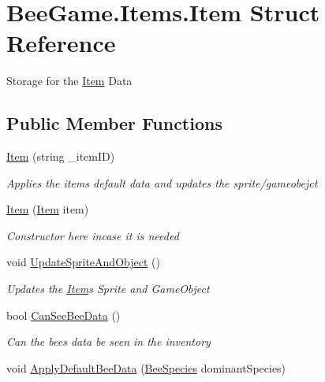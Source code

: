 \hypertarget{struct_bee_game_1_1_items_1_1_item}{}\section{Bee\+Game.\+Items.\+Item Struct Reference}
\label{struct_bee_game_1_1_items_1_1_item}


Storage for the \hyperlink{struct_bee_game_1_1_items_1_1_item}{Item} Data  


\subsection*{Public Member Functions}
\begin{DoxyCompactItemize}
\item 
\hyperlink{struct_bee_game_1_1_items_1_1_item_a38da9d1a85c2c67bc86f2d655386dbb2}{Item} (string \+\_\+item\+ID)
\begin{DoxyCompactList}\small\item\em Applies the item\textquotesingle{}s default data and updates the sprite/gameobejct \end{DoxyCompactList}\item 
\hyperlink{struct_bee_game_1_1_items_1_1_item_a6835b101e630bc6350059de3b058bae9}{Item} (\hyperlink{struct_bee_game_1_1_items_1_1_item}{Item} item)
\begin{DoxyCompactList}\small\item\em Constructor here incase it is needed \end{DoxyCompactList}\item 
void \hyperlink{struct_bee_game_1_1_items_1_1_item_a29abdb5010a23262e7562720bb85c171}{Update\+Sprite\+And\+Object} ()
\begin{DoxyCompactList}\small\item\em Updates the \hyperlink{struct_bee_game_1_1_items_1_1_item}{Item}\textquotesingle{}s Sprite and Game\+Object \end{DoxyCompactList}\item 
bool \hyperlink{struct_bee_game_1_1_items_1_1_item_a59ee527a4e9cd5b3e0ed2ec30f248a28}{Can\+See\+Bee\+Data} ()
\begin{DoxyCompactList}\small\item\em Can the bees data be seen in the inventory \end{DoxyCompactList}\item 
void \hyperlink{struct_bee_game_1_1_items_1_1_item_a9db12ff0f21d98b4505b661f6315a569}{Apply\+Default\+Bee\+Data} (\hyperlink{namespace_bee_game_1_1_enums_aa2ead984825678d83c42d48f6382619c}{Bee\+Species} dominant\+Species)

\end{DoxyCompactItemize}
